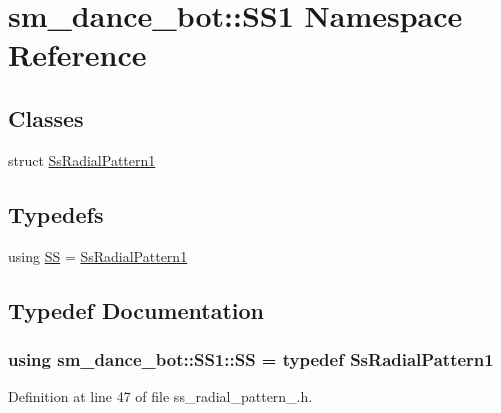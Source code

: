 \hypertarget{namespacesm__dance__bot_1_1SS1}{}\section{sm\+\_\+dance\+\_\+bot\+:\+:S\+S1 Namespace Reference}
\label{namespacesm__dance__bot_1_1SS1}
\subsection*{Classes}
\begin{DoxyCompactItemize}
\item 
struct \hyperlink{structsm__dance__bot_1_1SS1_1_1SsRadialPattern1}{Ss\+Radial\+Pattern1}
\end{DoxyCompactItemize}
\subsection*{Typedefs}
\begin{DoxyCompactItemize}
\item 
using \hyperlink{namespacesm__dance__bot_1_1SS1_a84fc38da71be89ddc4805298f7b82c66}{SS} = \hyperlink{structsm__dance__bot_1_1SS1_1_1SsRadialPattern1}{Ss\+Radial\+Pattern1}
\end{DoxyCompactItemize}


\subsection{Typedef Documentation}
\subsubsection[{\texorpdfstring{SS}{SS}}]{\setlength{\rightskip}{0pt plus 5cm}using {\bf sm\+\_\+dance\+\_\+bot\+::\+S\+S1\+::\+SS} = typedef {\bf Ss\+Radial\+Pattern1}}\hypertarget{namespacesm__dance__bot_1_1SS1_a84fc38da71be89ddc4805298f7b82c66}{}\label{namespacesm__dance__bot_1_1SS1_a84fc38da71be89ddc4805298f7b82c66}


Definition at line 47 of file ss\+\_\+radial\+\_\+pattern\+\_.\+h.

